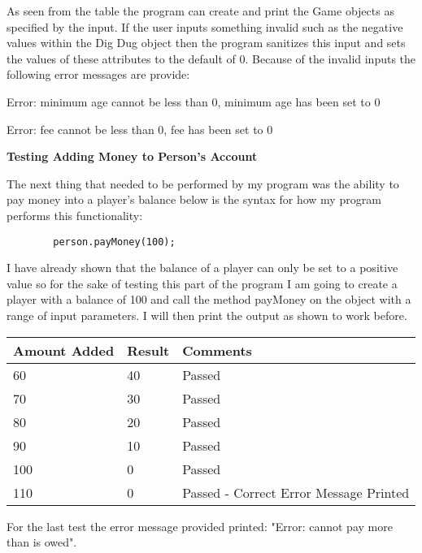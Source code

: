 \documentclass[a4paper]{article}
\begin{document}
As seen from the table the program can create and print the Game objects as specified by the input. If the user inputs something invalid such as the negative values within the Dig Dug object then the program sanitizes this input and sets the values of these attributes to the default of 0. Because of the invalid inputs the following error messages are provide:

\noindent Error: minimum age cannot be less than 0, minimum age has been set to 0

\noindent Error: fee cannot be less than 0, fee has been set to 0 \newline

\noindent \textbf{Testing Adding Money to Person's Account}

The next thing that needed to be performed by my program was the ability to pay money into a player's balance below is the syntax for how my program performs this functionality:
\begin{lstlisting}
		person.payMoney(100);
\end{lstlisting}
I have already shown that the balance of a player can only be set to a positive value so for the sake of testing this part of the program I am going to create a player with a balance of 100 and call the method payMoney on the object with a range of input parameters. I will then print the output as shown to work before.
\begin{table}[H]
\begin{tabular}{|l|l|l|}
\hline
\textbf{Amount Added} & \textbf{Result} & \textbf{Comments}                      \\ \hline
60                    & 40              & Passed                                 \\ \hline
70                    & 30              & Passed                                 \\ \hline
80                    & 20              & Passed                                 \\ \hline
90                    & 10              & Passed                                 \\ \hline
100                   & 0               & Passed                                 \\ \hline
110                   & 0               & Passed - Correct Error Message Printed \\ \hline
\end{tabular}
\end{table}
For the last test the error message provided printed: "Error: cannot pay more than is owed". \newline
\end{document}
